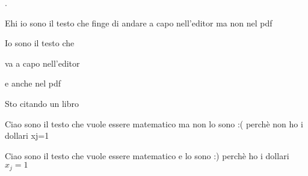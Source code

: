 .

Ehi io sono il testo che
finge di andare a capo nell'editor ma non nel pdf 

\vspace{2cm}

Io sono il testo che

va a capo nell'editor 

e anche nel pdf 

\vspace{2cm}
Sto citando un libro \cite{studiare2024}

\vspace{2cm}
Ciao sono il testo che vuole essere matematico ma non lo sono :( perchè non ho i dollari xj=1

Ciao sono il testo che vuole essere matematico e lo sono :) perchè ho i dollari  $x_j=1$




